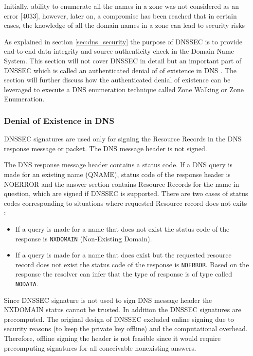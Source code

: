 Initially, ability to enumerate all the names in a zone was not considered as an error [4033], however, later on, a compromise has been reached that in certain cases, the knowledge of all the domain names in a zone can lead to security risks

As explained in section \ref{sec:dns_security} the purpose of DNSSEC is to provide end-to-end data integrity and source authenticity check in the Domain Name System. This section will not cover DNSSEC in detail but an important part of DNSSEC which is called an authenticated denial of 
of existence in DNS  \cite{RFC_7129}. The section will further discuss how the authenticated denial of existence can be leveraged to execute a DNS enumeration technique called Zone Walking or Zone Enumeration.

\subsubsection{Denial of Existence in DNS}

DNSSEC signatures are used only for signing the Resource Records in the DNS response message or packet. The DNS message header is not signed. \citep{RFC_7129}  

The DNS response message header contains a status code. If a DNS query is made for an existing name (QNAME), status code of the response header is NOERROR and the answer section contains Resource Records for the name in question, which are signed if DNSSEC is supported. 
There are two cases of status codes corresponding to situations where requested Resource record does not exits \cite{RFC_7129}:

\begin{itemize}
 \item If a query is made for a name that does not exist the status code of the response is \texttt{NXDOMAIN} (Non-Existing Domain).  
 \item If a query is made for a name that does exist but the requested resource record does not exist the status code of the response is \texttt{NOERROR}. Based on the response the resolver can infer that the type of response is of type called \texttt{NODATA}.
\end{itemize}

Since DNSSEC signature is not used to sign DNS message header the NXDOMAIN status cannot be trusted. In addition the DNSSEC signatures are precomputed. The original design of DNSSEC excluded online signing due to security reasons (to keep the private key offline) and the computational overhead. Therefore, offline signing the header is not feasible since it would require precomputing signatures for all conceivable nonexisting answers. \citep{RFC_7129}

